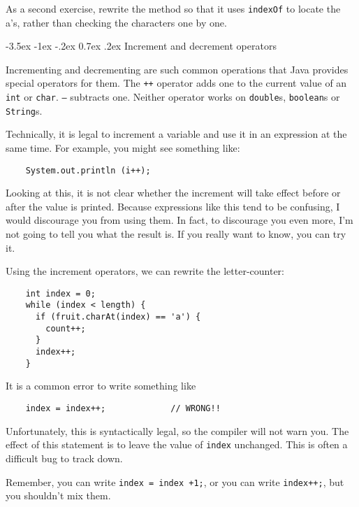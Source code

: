 \documentclass{book}
\makeatletter
\renewcommand{\section}{\@startsection 
    {section} {1} {0mm}%
    {-3.5ex \@plus -1ex \@minus -.2ex}%
    {0.7ex \@plus.2ex}%
    {\normalfont\Large\bfseries}}
\makeatother
\begin{document}

As a second exercise, rewrite the method so that it uses
{\tt indexOf} to locate the a's, rather than checking
the characters one by one.

\section{Increment and decrement operators}

Incrementing and decrementing are such common operations that
Java provides special operators for them.  The {\tt ++}
operator adds one to the current value of an {\tt int} or
{\tt char}.  {\tt --} subtracts one.  Neither operator works
on {\tt double}s, {\tt boolean}s or {\tt String}s.

Technically, it is legal to increment a variable and use it
in an expression at the same time.  For example, you might see
something like:

\begin{verbatim}
    System.out.println (i++);
\end{verbatim}
%
Looking at this, it is not clear whether the increment will
take effect before or after the value is printed.  Because
expressions like this tend to be confusing, I would discourage
you from using them.  In fact, to discourage you even more,
I'm not going to tell you what the result is.  If you really
want to know, you can try it.

Using the increment operators, we can rewrite the letter-counter:

\begin{verbatim}
    int index = 0;
    while (index < length) {
      if (fruit.charAt(index) == 'a') {
        count++;
      }
      index++;
    }
\end{verbatim}
%
It is a common error to write something like

\begin{verbatim}
    index = index++;             // WRONG!!
\end{verbatim}
%
Unfortunately, this is syntactically legal, so the compiler
will not warn you.  The effect of this statement is to leave
the value of {\tt index} unchanged.  This is often a difficult
bug to track down.

Remember, you can write {\tt index = index +1;}, or you
can write {\tt index++;}, but you shouldn't mix them.

\end{document}
